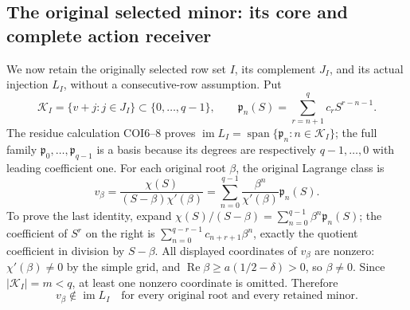 \subsection{The original selected minor: its core and complete action receiver}

We now retain the originally selected row set \(I\), its complement
\(J_I\), and its actual injection \(L_I\), without a consecutive-row
assumption.  Put
\[
 \mathcal K_I=\{v+j:j\in J_I\}\subset\{0,\ldots,q-1\},\qquad
 \mathfrak p_n(S)=\sum_{r=n+1}^q c_rS^{r-n-1}.
 \]
The residue calculation COI6--8 proves
\(\operatorname{im}L_I=\operatorname{span}\{\mathfrak p_n:
n\in\mathcal K_I\}\); the full family
\(\mathfrak p_0,\ldots,\mathfrak p_{q-1}\) is a basis because its
degrees are respectively \(q-1,\ldots,0\) with leading coefficient
one.
For each original root \(\beta\), the original Lagrange class is
\[
 v_\beta=\frac{\chi(S)}{(S-\beta)\chi'(\beta)}
       =\sum_{n=0}^{q-1}
               \frac{\beta^n}{\chi'(\beta)}\mathfrak p_n(S).
 \]
To prove the last identity, expand
\(\chi(S)/(S-\beta)=\sum_{n=0}^{q-1}\beta^n\mathfrak p_n(S)\);
the coefficient of \(S^r\) on the right is
\(\sum_{n=0}^{q-r-1}c_{n+r+1}\beta^n\), exactly the quotient
coefficient in division by \(S-\beta\).
All displayed coordinates of \(v_\beta\) are nonzero:
\(\chi'(\beta)\ne0\) by the simple grid, and
\(\operatorname{Re}\beta\geq a(1/2-\delta)>0\), so \(\beta\ne0\).
Since \(|\mathcal K_I|=m<q\), at least one nonzero coordinate is
omitted.  Therefore
\begin{equation}
 v_\beta\notin\operatorname{im}L_I
       \quad\text{for every original root and every retained minor.}
 \tag{CJA31}
\end{equation}

